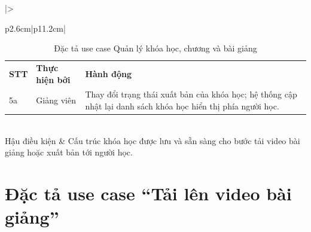 \documentclass[../DoAn.tex]{subfiles}
\begin{document}
\begin{table}[H]
\begin{tabular}{|>{\bfseries\raggedright\arraybackslash}p{2.6cm}|p{11.2cm}|}
\begin{tabular}{@{}>{\raggedright\arraybackslash}p{0.9cm}>{\raggedright\arraybackslash}p{2.0cm}p{7.3cm}@{}}
\textbf{STT} & \textbf{Thực hiện bởi} & \textbf{Hành động} \\[2pt]
5a & Giảng viên & Thay đổi trạng thái xuất bản của khóa học; hệ thống cập nhật lại danh sách khóa học hiển thị phía người học. \\[2pt]
\end{tabular} \\ \hline
Hậu điều kiện & Cấu trúc khóa học được lưu và sẵn sàng cho bước tải video bài giảng hoặc xuất bản tới người học. \\ \hline
\end{tabular}
\caption{Đặc tả use case Quản lý khóa học, chương và bài giảng}
\label{table:pl_uc_quanlykhoahoc}
\end{table}

\section{Đặc tả use case ``Tải lên video bài giảng''}
\end{document}
